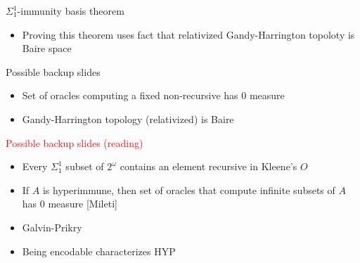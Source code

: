 \begin{frame}{$\Sigma_1^1$-immunity basis theorem}
  \begin{itemize}
    \item Proving this theorem uses fact that relativized Gandy-Harrington
      topoloty is Baire space
  \end{itemize}
\end{frame}

\begin{frame}{Possible backup slides}
  \begin{itemize}
    \item Set of oracles computing a fixed non-recursive has 0 measure
    \item Gandy-Harrington topology (relativized) is Baire
  \end{itemize}
\end{frame}

\begin{frame}{\textcolor{red}{Possible backup slides (reading)}}
  \begin{itemize}
    \item Every $\Sigma_1^1$ subset of $2^\omega$ contains an element
      recursive in Kleene's $O$
    \item If $A$ is hyperimmune, then set of oracles that compute
      infinite subsets of $A$ has 0 measure [Mileti]
    \item Galvin-Prikry
    \item Being encodable characterizes HYP
  \end{itemize}
\end{frame}
